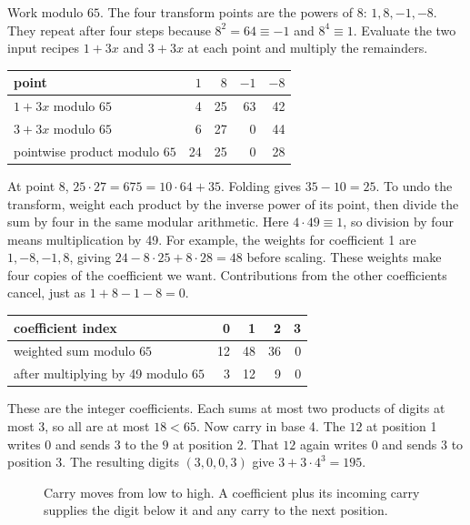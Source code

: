 Work modulo $65$. The four transform points are the powers of $8$:
$1,8,-1,-8$. They repeat after four steps because $8^2=64\equiv-1$ and
$8^4\equiv1$. Evaluate the two input recipes $1+3x$ and $3+3x$ at each point
and multiply the remainders.

\begin{center}
\small
\begin{tabular}{lrrrr}
\toprule
point & $1$ & $8$ & $-1$ & $-8$ \\
\midrule
$1+3x$ modulo $65$ & 4 & 25 & 63 & 42 \\
$3+3x$ modulo $65$ & 6 & 27 & 0 & 44 \\
pointwise product modulo $65$ & 24 & 25 & 0 & 28 \\
\bottomrule
\end{tabular}
\end{center}

At point 8, $25\cdot27=675=10\cdot64+35$. Folding gives $35-10=25$.
To undo the transform, weight each product by the inverse power of its
point, then divide the sum by four in the same modular arithmetic.
Here $4\cdot49\equiv1$, so division by four means multiplication by 49.
For example, the weights for coefficient 1 are $1,-8,-1,8$, giving
$24-8\cdot25+8\cdot28=48$ before scaling. These weights make four copies
of the coefficient we want. Contributions from the other coefficients
cancel, just as $1+8-1-8=0$.

\begin{center}
\small
\begin{tabular}{lrrrr}
\toprule
coefficient index & 0 & 1 & 2 & 3 \\
\midrule
weighted sum modulo $65$ & 12 & 48 & 36 & 0 \\
after multiplying by 49 modulo $65$ & 3 & 12 & 9 & 0 \\
\bottomrule
\end{tabular}
\end{center}

These are the integer coefficients. Each sums at most two products of
digits at most 3, so all are at most $18<65$. Now carry in base 4.
The $12$ at position 1 writes $0$ and sends $3$ to the $9$ at position 2.
That $12$ again writes $0$ and sends $3$ to position 3.
The resulting digits $(3,0,0,3)$ give $3+3\cdot4^3=195$.

\begin{figure}[H]
\centering
{}
\caption{Carry moves from low to high. A coefficient plus its incoming
carry supplies the digit below it and any carry to the next position.}
\end{figure}

